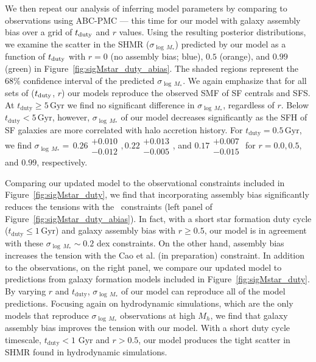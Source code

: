 \documentclass[12pt, letterpaper, preprint, tighten]{aastex62}
\begin{document}
We then repeat our analysis of inferring model parameters by comparing to  
observations using ABC-PMC --- this time for our model with galaxy assembly 
bias over a grid of $t_{\rm duty}$ and $r$ values. Using the resulting 
posterior distributions, we examine the scatter in the SHMR ($\sigma_{\log\,M_*}$) 
predicted by our model as a function of $t_{\rm duty}$ with $r=0$ (no 
assembly bias; blue), $0.5$ (orange), and $0.99$ (green) in Figure~\ref{fig:sigMstar_duty_abias}. 
The shaded regions represent the $68\%$ confidence interval of the predicted 
$\sigma_{\log\,M_*}$. We again emphasize that for all sets of ($t_{\rm duty}$, $r$) 
our models reproduce the observed SMF of SF centrals and SFS.  
At $t_\mathrm{duty} \geq 5\,\mathrm{Gyr}$ we find no significant difference 
in $\sigma_{\log\,M_*}$, regardless of $r$. Below $t_\mathrm{duty} < 5\,\mathrm{Gyr}$, 
however, $\sigma_{\log\,M_*}$ of our model decreases significantly as the SFH 
of SF galaxies are more correlated with halo accretion history.
For $t_\mathrm{duty} = 0.5\,\mathrm{Gyr}$, we find $\sigma_{\log\,M_*}{=}\,0.26\substack{+0.010\\-0.012}, 
0.22\substack{+0.013\\-0.005}$, and $0.17\substack{+0.007\\-0.015} $ 
for $r = 0.0, 0.5$, and $0.99$, respectively. 

Comparing our updated model to the observational constraints included in 
Figure~\ref{fig:sigMstar_duty}, we find that incorporating assembly bias 
significantly reduces the tensions with the~\cite{more2011, leauthaud2012, reddick2013, tinker2013, zu2015} 
constraints (left panel of Figure~\ref{fig:sigMstar_duty_abias}). In fact, 
with a short star formation duty cycle ($t_\mathrm{duty} \leq 1\,\mathrm{Gyr}$) 
and galaxy assembly bias with $r \ge 0.5$, our model is in agreement with 
these $\sigma_{\log\,M_*} \sim 0.2$ dex constraints. On the other hand, 
assembly bias increases the tension with the Cao et al. (in preparation) constraint. 
In addition to the observations, on the right panel, we compare our updated 
model to predictions from galaxy formation models included in Figure~\ref{fig:sigMstar_duty}.
By varying $r$ and $t_\mathrm{duty}$, $\sigma_{\log\,M_*}$ of our model 
can reproduce all of the model predictions. Focusing again on hydrodynamic
simulations, which are the only models that reproduce $\sigma_{\log\,M_*}$ 
observations at high $M_h$, we find that galaxy assembly bias 
improves the tension with our model. With a short duty cycle timescale, 
$t_\mathrm{duty} < 1$ Gyr and $r > 0.5$, our model produces the tight
scatter in SHMR found in hydrodynamic simulations. 
\end{document}
